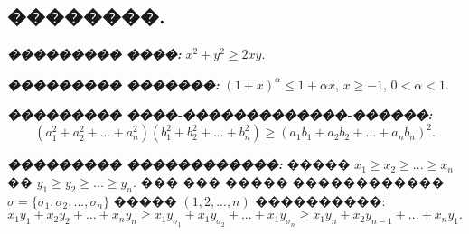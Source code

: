 \documentclass[a4paper,12pt]{article}
\begin{document}
\newpage

\begin{center}
\section*{��������.}
\end{center}
 \textbf{\textit{��������� ����:}} $x^{2}+y^{2}\geq 2xy.$

 \textbf{\textit{��������� �������:}} $(1+x)^{\alpha}\leq 1+\alpha x$, $x\geq -1$, $0<\alpha <1$.

 \textbf{\textit{��������� ����-�������������-������:}} $$(a_{1}^{2}+a_{2}^{2}+...+a_{n}^{2})(b_{1}^{2}+b_{2}^{2}+...+b_{n}^{2}) \geq (a_{1}b_{1}+a_{2}b_{2}+...+a_{n}b_{n})^{2}.$$

 \textbf{\textit{��������� ������������:}} ����� $x_{1}\geq x_{2}\geq ... \geq x_{n}$ �� $y_{1}\geq y_{2}\geq ... \geq y_{n}$. ��� ��� ����� ������������ $\sigma = \{\sigma_{1},\sigma_{2},...,\sigma_{n}\}$ ����� $(1,2,...,n)$ ����������: $$x_{1}y_{1}+x_{2}y_{2}+...+x_{n}y_{n}\geq x_{1}y_{\sigma_{1}}+x_{1}y_{\sigma_{2}}+...+x_{1}y_{\sigma_{n}}\geq x_{1}y_{n}+x_{2}y_{n-1}+...+x_{n}y_{1}.$$

\medskip\medskip\medskip
\end{document}
